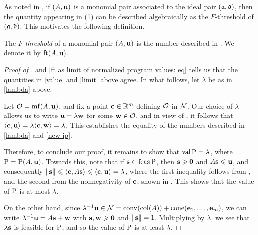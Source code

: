 \documentclass[11pt]{amsart}
\begin{document}
As noted in , if $(A,\mathbf{u})$ is a monomial pair associated to the ideal pair $(\mathfrak{a},\mathfrak{d})$, then the quantity appearing in (1) can be described algebraically as the $F$-threshold of $(\mathfrak{a},\mathfrak{d})$.
This motivates the following definition.

\begin{definition}
\label{FT: D}
   The \emph{$F$-threshold} of a monomial pair $(A, \mathbf{u})$ is the number described in .  We denote it by $\operatorname{ft}(A, \mathbf{u})$.
\end{definition}

\begin{proof}[Proof of ]
  and \eqref{ft as limit of normalized program values: eq} tells us that the quantities in \eqref{value} and \eqref{limit} above agree.  In what follows, let $\lambda$ be as in \eqref{lambda} above.


    Let $\mathcal{O} = \operatorname{mf}(A,\mathbf{u})$, and fix a point $\mathbf{c} \in \mathbb{R}^m$ defining $\mathcal{O}$ in $\mathcal{N}$.  Our choice of $\lambda$ allows us to write
    $\mathbf{u} = \lambda \mathbf{w}$ for some $\mathbf{w} \in \mathcal{O}$,  and in view of , it follows that $\langle \mathbf{c}, \mathbf{u} \rangle = \lambda \langle \mathbf{c}, \mathbf{w} \rangle = \lambda$.
   This establishes the equality of the numbers described in \eqref{lambda} and \eqref{new ip}.

Therefore, to conclude our proof,  it remains to show that $\operatorname{val} \mathrm{P} = \lambda$, where $\mathrm{P} = \mathrm{P}(A, \mathbf{u})$.  Towards this, note that if $\mathbf{s} \in \operatorname{feas} \mathrm{P}$, then $\mathbf{s}\geqslant \mathbf{0}$ and $A \mathbf{s} \leqslant \mathbf{u}$, and consequently
  $\| \mathbf{s} \| \leqslant \langle \mathbf{c}, A \mathbf{s} \rangle \leqslant \langle \mathbf{c}, \mathbf{u} \rangle = \lambda$,
   where the first inequality follows from , and the second from the nonnegativity of $\mathbf{c}$, shown in .
   This shows that the value of $\mathrm{P}$ is at most $\lambda$. 

   On the other hand, since $\lambda^{-1}\mathbf{u} \in \mathcal{N} = \operatorname{conv}(\operatorname{col}(A)) + \operatorname{cone}(\mathbf{e}_1,\ldots,\mathbf{e}_m)$, we can write $\lambda^{-1}\mathbf{u} = A\mathbf{s}+\mathbf{w}$ with $\mathbf{s}, \mathbf{w} \geqslant \mathbf{0}$ and $\| \mathbf{s} \| = 1$.
   Multiplying by $\lambda$, we see that  $\lambda\mathbf{s}$ is feasible for $\mathrm{P}$, and so the value of $\mathrm{P}$ is at least $\lambda$.
\end{proof}
\end{document}
